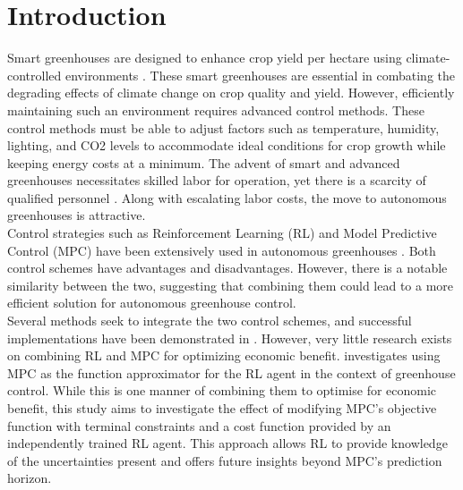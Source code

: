 \section{Introduction}
Smart greenhouses are designed to enhance crop yield per hectare using climate-controlled environments \cite{morcegoReinforcementLearningModel2023}. These smart greenhouses are essential in combating the degrading effects of climate change on crop quality and yield. However, efficiently maintaining such an environment requires advanced control methods. These control methods must be able to adjust factors such as temperature, humidity, lighting, and CO2 levels to accommodate ideal conditions for crop growth \cite{devopsGreenhouseClimateControl2021} while keeping energy costs at a minimum. The advent of smart and advanced greenhouses necessitates skilled labor for operation, yet there is a scarcity of qualified personnel \cite{rusnakWhatCurrentState2018}. Along with escalating labor costs, the move to autonomous greenhouses is attractive.\\
Control strategies such as Reinforcement Learning (RL) and Model Predictive Control (MPC) have been extensively used in autonomous greenhouses \cite{morcegoReinforcementLearningModel2023, boersmaRobustSamplebasedModel2022, lubbersAutonomousGreenhouseClimate2023, jansenOptimalControlLettuce2023}. Both control schemes have advantages and disadvantages. However, there is a notable similarity between the two, suggesting that combining them could lead to a more efficient solution for autonomous greenhouse control.\\
Several methods seek to integrate the two control schemes, and successful implementations have been demonstrated in \cite{lubbersAutonomousGreenhouseClimate2023, arroyoReinforcedModelPredictive2022, linReinforcementLearningBasedModel2023}. However, very little research exists on combining RL and MPC for optimizing economic benefit. \citet{lubbersAutonomousGreenhouseClimate2023} investigates using MPC as the function approximator for the RL agent in the context of greenhouse control. While this is one manner of combining them to optimise for economic benefit, this study aims to investigate the effect of modifying MPC's objective function with terminal constraints and a cost function provided by an independently trained RL agent. This approach allows RL to provide knowledge of the uncertainties present and offers future insights beyond MPC's prediction horizon.

